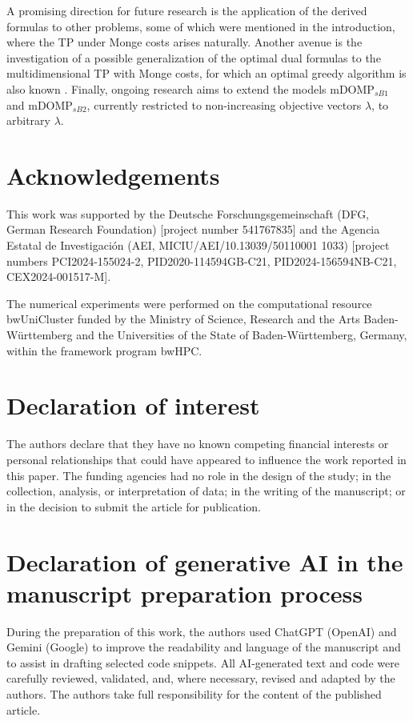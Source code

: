\documentclass[letterpaper]{article}
\begin{document}
A promising direction for future research is the application of the derived formulas to other problems, some of which were mentioned in the introduction, where the TP under Monge costs arises naturally. Another avenue is the investigation of a possible generalization of the optimal dual formulas to the multidimensional TP with Monge costs, for which an optimal greedy algorithm is also known \citep[cf.][Theorem 6.5]{BurkardKlinzRudolf1996}. Finally, ongoing research aims to extend the models $\text{mDOMP}_{sB1}$ and $\text{mDOMP}_{sB2}$, currently restricted to non-increasing objective vectors $\lambda$, to arbitrary $\lambda$.


\section*{Acknowledgements}
This work was supported by the Deutsche Forschungsgemeinschaft (DFG, German Research Foundation) [project number 541767835] and the Agencia Estatal de Investigación (AEI, MICIU/AEI/10.13039/50110001 1033) [project numbers PCI2024-155024-2, PID2020-114594GB-C21, PID2024-156594NB-C21, CEX2024-001517-M].

The numerical experiments were performed on the computational resource bwUniCluster funded by the Ministry of Science, Research and the Arts Baden-Württemberg and the Universities of the State of Baden-Württemberg, Germany, within the framework program bwHPC.


\section*{Declaration of interest}
The authors declare that they have no known competing financial interests or personal relationships that could have appeared to influence the work reported in this paper. The funding agencies had no role in the design of the study; in the collection, analysis, or interpretation of data; in the writing of the manuscript; or in the decision to submit the article for publication.


\section*{Declaration of generative AI in the manuscript preparation process}
During the preparation of this work, the authors used ChatGPT (OpenAI) and Gemini (Google) to improve the readability and language of the manuscript and to assist in drafting selected code snippets. All AI-generated text and code were carefully reviewed, validated, and, where necessary, revised and adapted by the authors. The authors take full responsibility for the content of the published article.



\end{document}
